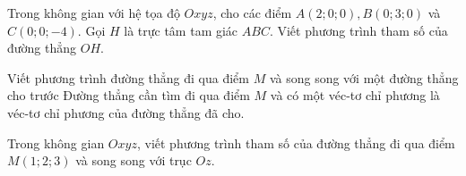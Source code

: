\begin{bt}%
	Trong không gian với hệ tọa độ $Oxyz$, cho các điểm $A\left(2;0;0\right),B\left(0;3;0\right)$ và $C\left(0;0;-4\right)$. Gọi $H$ là trực tâm tam giác $ABC$. Viết phương trình tham số của đường thẳng $OH$.
	\end{bt}
\begin{dang}{Viết phương trình đường thẳng đi qua điểm $M$ và song song với một đường thẳng cho trước}
Đường thẳng cần tìm đi qua điểm $M$ và có một véc-tơ chỉ phương là véc-tơ chỉ phương của đường thẳng đã cho.
\end{dang}
\begin{vd}%
Trong không gian $Oxyz$, viết phương trình tham số của đường thẳng đi qua điểm $M(1;2;3)$ và song song với trục $Oz$.
\end{vd}

